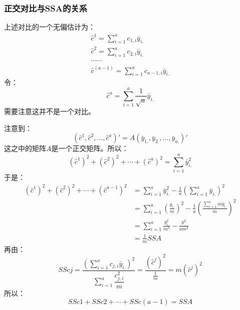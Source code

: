 \subsubsection{正交对比与SSA的关系}
上述对比的一个无偏估计为：
\begin{gather*}
	\hat{c}^1=\sum_{i=1}^ac_{1,i}\bar{y}_{i.} \\
	\hat{c}^2=\sum_{i=1}^ac_{2,i}\bar{y}_{i.} \\
	\cdots\cdots \\
	\hat{c}^{(a-1)}=\sum_{i=1}^ac_{a-1,i}\bar{y}_{i.}
\end{gather*}
令：
\begin{equation*}
	\hat{c}^{a}=\sum_{i=1}^a\frac{1}{\sqrt{a}}\bar{y}_{i.}
\end{equation*}
需要注意这并不是一个对比。\par
注意到：
\begin{equation*}
	(\hat{c}^1,\hat{c}^2,\dots,\hat{c}^a)'=A(\bar{y}_{1.},\bar{y}_{2.},\dots,\bar{y}_{a.})'
\end{equation*}
这之中的矩阵$A$是一个正交矩阵。所以：
\begin{equation*}
	(\hat{c}^1)^2+(\hat{c}^2)^2+\cdots+(\hat{c}^a)^2=\sum_{i=1}^a\bar{y}_{i.}^2
\end{equation*}
于是：
\begin{align*}
	(\hat{c}^1)^2+(\hat{c}^2)^2+\cdots+(\hat{c}^{a-1})^2
	&=\sum_{i=1}^a\bar{y}_{i.}^2-\frac{1}{a}\left(\sum\limits_{i=1}^a\bar{y}_{i.}\right)^2 \\
	&=\sum_{i=1}^a\left(\frac{y_{i.}}{m}\right)^2-\frac{1}{a}\left(\frac{\sum_{i=1}^am\bar{y}_{i.}}{m}\right)^2 \\
	&=\sum_{i=1}^a\frac{y_{i.}^2}{m^2}-\frac{y_{..}^2}{am^2} \\
	&=\frac{1}{m}SSA
\end{align*}
再由：
\begin{equation*}
	SScj=\frac{\left(\sum\limits_{i=1}^ac_{j,i}\bar{y}_{i.}\right)^2}{\sum\limits_{i=1}^a\dfrac{c_{j,i}^2}{m}}=\frac{(\hat{c}^j)^2}{\frac{1}{m}}=m(\hat{c}^j)^2
\end{equation*}
所以：
\begin{equation*}
	SSc1+SSc2+\cdots+SSc(a-1)=SSA
\end{equation*}
